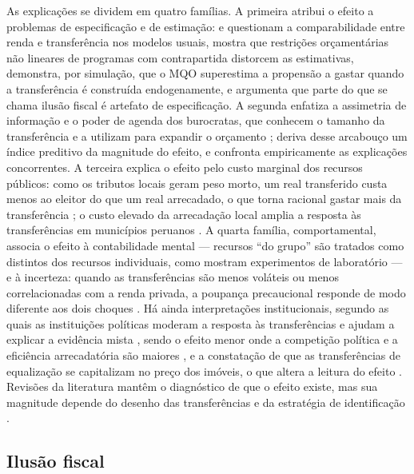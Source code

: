As explicações se dividem em quatro famílias. A primeira atribui o efeito a problemas de especificação e de estimação:  e  questionam a comparabilidade entre renda e transferência nos modelos usuais,  mostra que restrições orçamentárias não lineares de programas com contrapartida distorcem as estimativas,  demonstra, por simulação, que o MQO superestima a propensão a gastar quando a transferência é construída endogenamente, e  argumenta que parte do que se chama ilusão fiscal é artefato de especificação. A segunda enfatiza a assimetria de informação e o poder de agenda dos burocratas, que conhecem o tamanho da transferência e a utilizam para expandir o orçamento \cite{romer1980,filimon1982};  deriva desse arcabouço um índice preditivo da magnitude do efeito, e  confronta empiricamente as explicações concorrentes. A terceira explica o efeito pelo custo marginal dos recursos públicos: como os tributos locais geram peso morto, um real transferido custa menos ao eleitor do que um real arrecadado, o que torna racional gastar mais da transferência \cite{hamilton1986,dahlby2011}; o custo elevado da arrecadação local amplia a resposta às transferências em municípios peruanos \cite{aragon2013}. A quarta família, comportamental, associa o efeito à contabilidade mental --- recursos ``do grupo'' são tratados como distintos dos recursos individuais, como mostram experimentos de laboratório \cite{becker2020} --- e à incerteza: quando as transferências são menos voláteis ou menos correlacionadas com a renda privada, a poupança precaucional responde de modo diferente aos dois choques \cite{vegh2015}. Há ainda interpretações institucionais, segundo as quais as instituições políticas moderam a resposta às transferências e ajudam a explicar a evidência mista \cite{kjaergaard2015}, sendo o efeito menor onde a competição política e a eficiência arrecadatória são maiores \cite{rios2021}, e a constatação de que as transferências de equalização se capitalizam no preço dos imóveis, o que altera a leitura do efeito \cite{allers2016}. Revisões da literatura mantêm o diagnóstico de que o efeito existe, mas sua magnitude depende do desenho das transferências e da estratégia de identificação \cite{bailey1998,lago2024}.

\subsection{Ilusão fiscal}

